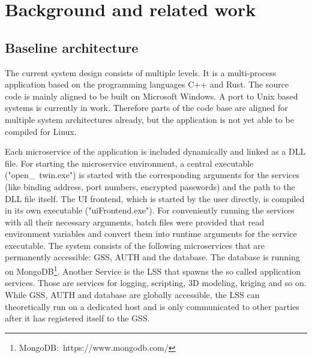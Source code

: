 
\chapter{Background and related work} %

\label{chap:background} %




\section{Baseline architecture}
The current system design consists of multiple levels. It is a multi-process application based on the programming languages C++ and Rust. The source code is mainly aligned to be built on Microsoft Windows. A port to Unix based systems is currently in work. Therefore parts of the code base are aligned for multiple system architectures already, but the application is not yet able to be compiled for Linux.

Each microservice of the application is included dynamically and linked as a \ac{DLL} file. For starting the microservice environment, a central executable ("open\_\ twin.exe") is started with the corresponding arguments for the services (like binding address, port numbers, encrypted passwords) and the path to the \ac{DLL} file itself. The UI frontend, which is started by the user directly, is compiled in its own executable ("uiFrontend.exe").
For conveniently running the services with all their necessary arguments, batch files were provided that read environment variables and convert them into runtime arguments for the service executable.
The system consists of the following microservices that are permanently accessible: \ac{GSS}, \ac{AUTH} and the database. The database is running on MongoDB\footnote{MongoDB:~https://www.mongodb.com/}. Another Service is the \ac{LSS} that spawns the so called application services. Those are services for logging, scripting, 3D modeling, kriging and so on.
While \ac{GSS}, \ac{AUTH} and database are globally accessible, the \ac{LSS} can theoretically run on a dedicated host and is only communicated to other parties after it has registered itself to the \ac{GSS}.

